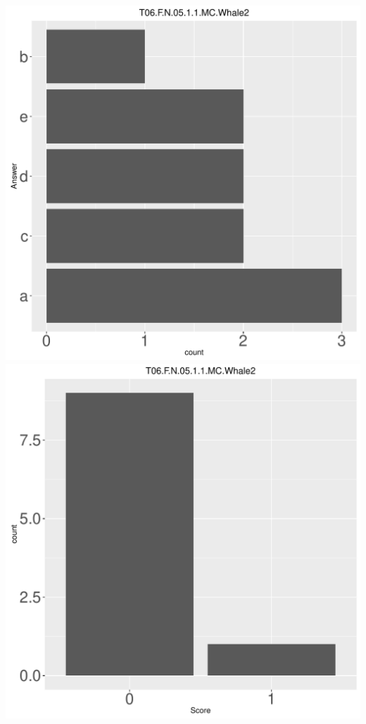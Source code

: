 \documentclass[12pt,english,nohyper]{tufte-handout}\usepackage[]{graphicx}\usepackage[]{color}
\begin{document}
\begin{center} \includegraphics[width=.45\linewidth]{Topic06_AB_53_answer} \includegraphics[width=.45\linewidth]{Topic06_AB_53_score} \end{center} 
\end{document}
